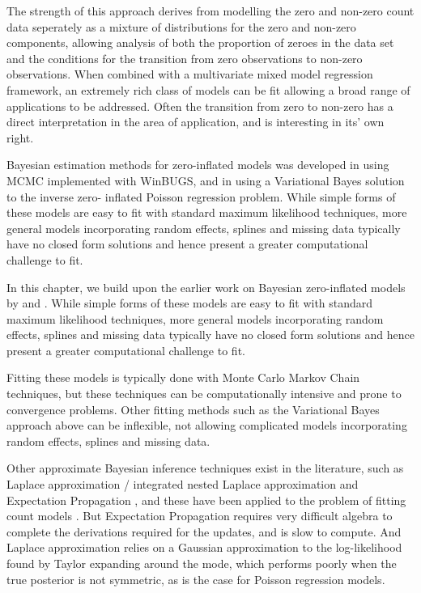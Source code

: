 The strength of this approach derives from modelling the zero and non-zero count data seperately as a mixture
of distributions for the zero and non-zero components, allowing analysis of both the proportion of zeroes in
the data set and the conditions for the transition from zero observations to non-zero observations. When
combined with a multivariate mixed model regression framework, an extremely rich class of models can be fit
allowing a broad range of applications to be addressed. Often the transition from zero to non-zero has a
direct interpretation in the area of application, and is interesting in its' own right.

Bayesian estimation methods for zero-inflated models was developed in \citep{Ghosh2006} using MCMC
implemented with WinBUGS, and in \citep{Vatsa2014} using a Variational Bayes solution to the inverse zero-
inflated Poisson regression problem. While simple forms of these models are easy to fit with standard  maximum
likelihood techniques, more general models incorporating random effects, splines and missing data  typically
have no closed form solutions and hence present a greater computational challenge to fit.

In this chapter, we build upon the earlier work on Bayesian zero-inflated models by \citep{Ghosh2006} and
\citep{Vatsa2014}. While simple forms of these models are easy to fit with standard maximum likelihood
techniques, more general models incorporating random effects, splines and missing data typically have no
closed form solutions and hence present a greater computational challenge to fit.

Fitting these models is typically done with Monte Carlo Markov Chain techniques, but these techniques can be
computationally intensive and prone to convergence problems.  Other fitting methods such as the Variational
Bayes approach above can be inflexible, not allowing complicated models incorporating random effects, splines
and missing data.

Other approximate Bayesian inference techniques exist in the literature, such as
Laplace approximation \cite{Tierney1986}/ integrated nested Laplace approximation \cite{Rue2009} and Expectation Propagation \cite{Minka2013}, and these have been applied to the problem of fitting
count models
\cite{Barber2016}
\cite{KimWand2017}.
But Expectation Propagation requires very difficult algebra to complete the derivations required for the
updates, and is slow to compute. And Laplace approximation relies on a Gaussian approximation to the
log-likelihood found by Taylor expanding around the mode, which performs poorly when the true posterior is
not symmetric, as is the case for Poisson regression models.

